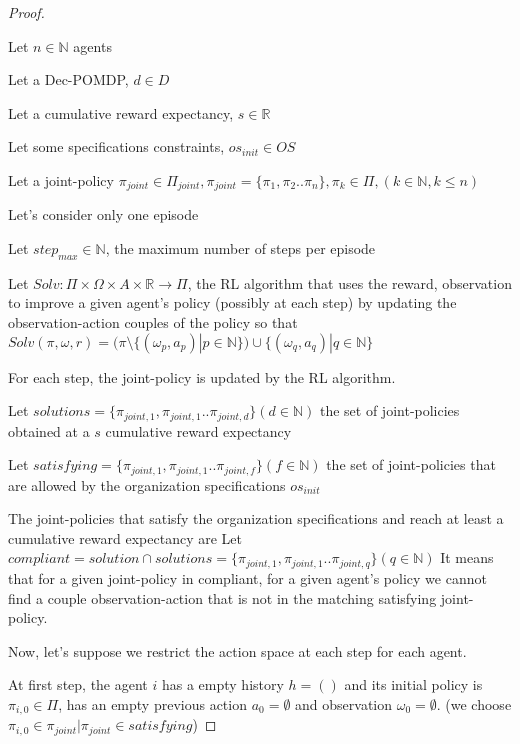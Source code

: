 \begin{proof}\label{proof:jpc_to_ac}
    
    Let $n \in \mathbb{N}$ agents
    
    Let a Dec-POMDP, $d \in D$
    
    Let a cumulative reward expectancy, $s \in \mathbb{R}$
    
    Let some specifications constraints, $os_{init} \in OS$
    
    Let a joint-policy $\pi_{joint} \in \Pi_{joint}, \allowbreak \pi_{joint} = \{\pi_1,\pi_2..\pi_n\}, \pi_k \in \Pi,(k \in \mathbb{N}, k \leq n)$
    
    Let's consider only one episode
    
    Let $step_{max} \in \mathbb{N}$, the maximum number of steps per episode
    
    Let $Solv: \Pi \times \Omega \times A \times \mathbb{R} \rightarrow \Pi$, the RL algorithm that uses the reward, observation to improve a given agent's policy (possibly at each step) by updating the observation-action couples of the policy so that $Solv(\pi, \omega, r) = (\pi \setminus \{(\omega_p, a_p) | p \in \mathbb{N}\}) \cup \{(\omega_q, a_q) | q \in \mathbb{N}\}$
    
    For each step, the joint-policy is updated by the RL algorithm.
    
    Let $solutions = \{\pi_{joint,1}, \pi_{joint,1}.. \pi_{joint,d}\} (d \in \mathbb{N})$ the set of joint-policies obtained at a $s$ cumulative reward expectancy
    
    Let $satisfying = \{\pi_{joint,1}, \pi_{joint,1}.. \pi_{joint,f}\} (f \in \mathbb{N})$ the set of joint-policies that are allowed by the organization specifications $os_{init}$
    
    The joint-policies that satisfy the organization specifications and reach at least a cumulative reward expectancy are
    Let $compliant = solution \cap solutions = \{\pi_{joint,1}, \pi_{joint,1}.. \pi_{joint,q}\} (q \in \mathbb{N})$
    It means that for a given joint-policy in compliant, for a given agent's policy we cannot find a couple observation-action that is not in the matching satisfying joint-policy.

    Now, let's suppose we restrict the action space at each step for each agent.

    At first step, the agent $i$ has a empty history $h = ()$ and its initial policy is $\pi_{i,0} \in \Pi$, has an empty previous action $a_0 = \emptyset$ and observation $\omega_0 = \emptyset$.
    (we choose $\pi_{i,0} \in \pi_{joint} | \pi_{joint} \in satisfying$)


\end{proof}

